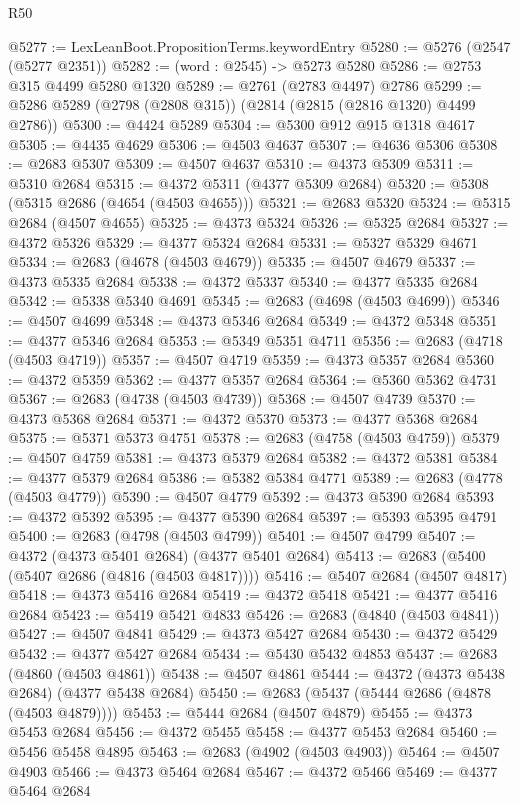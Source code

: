 \begin{lexlean}{R50}
\begin{coremodule}
@5277 := LexLeanBoot.PropositionTerms.keywordEntry
@5280 := @5276 (@2547 (@5277 @2351))
@5282 := (word : @2545) -> @5273 @5280
@5286 := @2753 @315 @4499 @5280 @1320
@5289 := @2761 (@2783 @4497) @2786
@5299 := @5286 @5289 (@2798 (@2808 @315)) (@2814 (@2815 (@2816 @1320) @4499 @2786))
@5300 := @4424 @5289
@5304 := @5300 @912 @915 @1318 @4617
@5305 := @4435 @4629
@5306 := @4503 @4637
@5307 := @4636 @5306
@5308 := @2683 @5307
@5309 := @4507 @4637
@5310 := @4373 @5309
@5311 := @5310 @2684
@5315 := @4372 @5311 (@4377 @5309 @2684)
@5320 := @5308 (@5315 @2686 (@4654 (@4503 @4655)))
@5321 := @2683 @5320
@5324 := @5315 @2684 (@4507 @4655)
@5325 := @4373 @5324
@5326 := @5325 @2684
@5327 := @4372 @5326
@5329 := @4377 @5324 @2684
@5331 := @5327 @5329 @4671
@5334 := @2683 (@4678 (@4503 @4679))
@5335 := @4507 @4679
@5337 := @4373 @5335 @2684
@5338 := @4372 @5337
@5340 := @4377 @5335 @2684
@5342 := @5338 @5340 @4691
@5345 := @2683 (@4698 (@4503 @4699))
@5346 := @4507 @4699
@5348 := @4373 @5346 @2684
@5349 := @4372 @5348
@5351 := @4377 @5346 @2684
@5353 := @5349 @5351 @4711
@5356 := @2683 (@4718 (@4503 @4719))
@5357 := @4507 @4719
@5359 := @4373 @5357 @2684
@5360 := @4372 @5359
@5362 := @4377 @5357 @2684
@5364 := @5360 @5362 @4731
@5367 := @2683 (@4738 (@4503 @4739))
@5368 := @4507 @4739
@5370 := @4373 @5368 @2684
@5371 := @4372 @5370
@5373 := @4377 @5368 @2684
@5375 := @5371 @5373 @4751
@5378 := @2683 (@4758 (@4503 @4759))
@5379 := @4507 @4759
@5381 := @4373 @5379 @2684
@5382 := @4372 @5381
@5384 := @4377 @5379 @2684
@5386 := @5382 @5384 @4771
@5389 := @2683 (@4778 (@4503 @4779))
@5390 := @4507 @4779
@5392 := @4373 @5390 @2684
@5393 := @4372 @5392
@5395 := @4377 @5390 @2684
@5397 := @5393 @5395 @4791
@5400 := @2683 (@4798 (@4503 @4799))
@5401 := @4507 @4799
@5407 := @4372 (@4373 @5401 @2684) (@4377 @5401 @2684)
@5413 := @2683 (@5400 (@5407 @2686 (@4816 (@4503 @4817))))
@5416 := @5407 @2684 (@4507 @4817)
@5418 := @4373 @5416 @2684
@5419 := @4372 @5418
@5421 := @4377 @5416 @2684
@5423 := @5419 @5421 @4833
@5426 := @2683 (@4840 (@4503 @4841))
@5427 := @4507 @4841
@5429 := @4373 @5427 @2684
@5430 := @4372 @5429
@5432 := @4377 @5427 @2684
@5434 := @5430 @5432 @4853
@5437 := @2683 (@4860 (@4503 @4861))
@5438 := @4507 @4861
@5444 := @4372 (@4373 @5438 @2684) (@4377 @5438 @2684)
@5450 := @2683 (@5437 (@5444 @2686 (@4878 (@4503 @4879))))
@5453 := @5444 @2684 (@4507 @4879)
@5455 := @4373 @5453 @2684
@5456 := @4372 @5455
@5458 := @4377 @5453 @2684
@5460 := @5456 @5458 @4895
@5463 := @2683 (@4902 (@4503 @4903))
@5464 := @4507 @4903
@5466 := @4373 @5464 @2684
@5467 := @4372 @5466
@5469 := @4377 @5464 @2684

\end{coremodule}
\end{lexlean}
